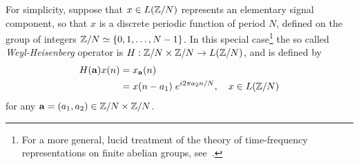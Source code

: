 For simplicity, suppose that $x \in L(\mathbb{Z}/N)$ represents an elementary signal
component, so that $x$ is a discrete periodic function of period $N$, defined
on the group of integers $\mathbb{Z}/N \simeq \{0,1,\ldots,N-1\}$.  In this
special case\footnote{For a more general, lucid treatment of the theory of
  time-frequency representations on finite abelian groups,
  see~.} 
the so called \emph{Weyl-Heisenberg} operator is
$H : \mathbb{Z} /N \times \mathbb{Z} /N \rightarrow  L(\mathbb{Z} /N)$,
and is defined by
\begin{align*}
H(\a)x(n) &= x_\a(n) \nonumber\\
&= x(n-a_1)\;e^{i2\pi a_2n/N},
\quad x \in L(\Z/N) %
\end{align*}
for any $\mathbf{a} = (a_1,a_2) \in \mathbb{Z} /N \times \mathbb{Z} /N$.

